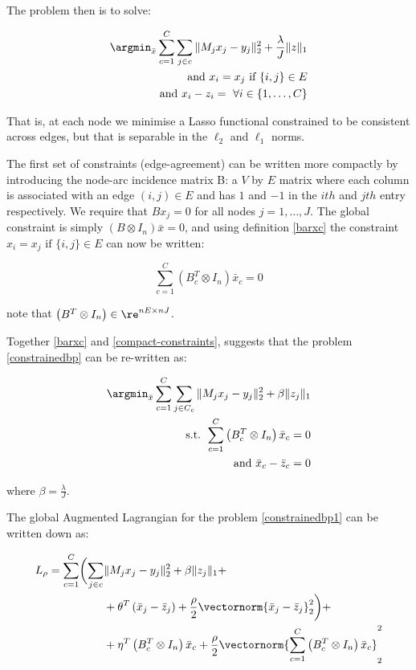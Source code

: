 The problem then is to solve:

\begin{align}
\argmin_{\bar{x}} \sum_{c=1}^C \sum_{j \in c} \|M_jx_j - y_j\|_2^2 + \frac{\lambda}{J}\|z\|_1 \nonumber \\ 
\text{ and } x_i = x_j \text{ if } \{i,j\} \in E \nonumber \\
\text{ and } x_i - z_i = \text{ } \forall i \in \{1, \ldots, C\}
\label{constrainedbp}
\end{align}

That is, at each node we minimise a Lasso functional constrained to be consistent across edges, but that is separable in the \(\ell_2\) and \(\ell_1\) norms.

The first set of constraints (edge-agreement) can be written more compactly by introducing the node-arc incidence matrix B: a \(V\) by \(E\) matrix where each column is associated with an edge \(\left(i,j\right) \in E\) and has \(1\) and \(-1\) in the \(ith\) and \(jth\) entry respectively. We require that \( Bx_j = 0 \) for all nodes \(j = 1, \ldots,  J\). The global constraint is simply \( (B \otimes I_n)\bar{x} = 0\), and using definition \eqref{barxc} the constraint \(x_i = x_j \text{ if } \{i,j\} \in E \) can now be written:

\begin{equation}
\sum_{c=1}^C\left(B_c^T \otimes I_n\right)\bar{x}_c = 0
\label{compact-constraints}
\end{equation}

note that \(\left(B^T\otimes I_n \right) \in \re^{nE \times nJ}\).

 Together \eqref{barxc} and \eqref{compact-constraints}, suggests that the problem \eqref{constrainedbp} can be re-written as:

\begin{align}
\argmin_{\bar{x}} \sum_{c=1}^C \sum_{j \in C_c} \|M_jx_j - y_j\|_2^2 + \beta\|z_j\|_1
\nonumber \\
\text{ s.t. } \sum_{c=1}^C\left(B_c^T \otimes I_n\right)\bar{x}_c = 0 \nonumber \\
\text{ and } \bar{x}_c - \bar{z}_c = 0
\label{constrainedbp1}
\end{align}

where \(\beta = \frac{\lambda}{J}\).

The global Augmented Lagrangian \cite{Boyd2010a}
 for the problem \eqref{constrainedbp1} can be written down as:

\begin{align}
L_\rho = \sum_{c=1}^C  \biggl( \sum_{j \in c} & \|M_jx_j - y_j\|_2^2 + \beta\|z_j\|_1  + \nonumber \\ & + \theta^T\left(\bar{x}_j - \bar{z}_j\right)  +  \frac{\rho}{2}\vectornorm{\bar{x}_j-\bar{z}_j}_2^2 \biggr) + \nonumber \\  & + \eta^T\left(B_c^T \otimes I_n\right)\bar{x}_c + \frac{\rho}{2}\vectornorm{\sum_{c=1}^C\left(B_c^T \otimes I_n\right)\bar{x}_c}_2^2
\label{aug-lagrange}
\end{align}

